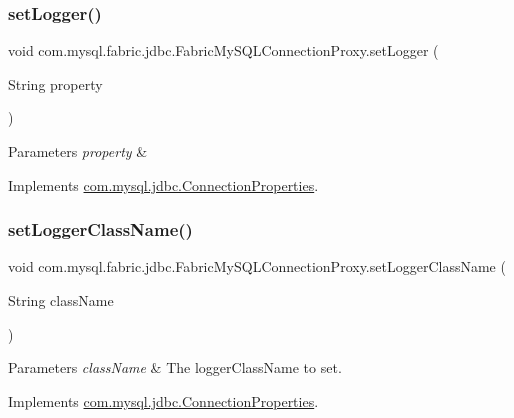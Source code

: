 \subsubsection{\texorpdfstring{set\+Logger()}{setLogger()}}
{\footnotesize\ttfamily void com.\+mysql.\+fabric.\+jdbc.\+Fabric\+My\+S\+Q\+L\+Connection\+Proxy.\+set\+Logger (\begin{DoxyParamCaption}\item[{String}]{property }\end{DoxyParamCaption})}


\begin{DoxyParams}{Parameters}
{\em property} & \\
\hline
\end{DoxyParams}


Implements \mbox{\hyperlink{interfacecom_1_1mysql_1_1jdbc_1_1_connection_properties_a9ad6baf8983bc1bf352b58b0e1634be1}{com.\+mysql.\+jdbc.\+Connection\+Properties}}.

\mbox{\label{classcom_1_1mysql_1_1fabric_1_1jdbc_1_1_fabric_my_s_q_l_connection_proxy_aefe48ee60272636a1e6ee1aaf99ddfc0}} 
\subsubsection{\texorpdfstring{set\+Logger\+Class\+Name()}{setLoggerClassName()}}
{\footnotesize\ttfamily void com.\+mysql.\+fabric.\+jdbc.\+Fabric\+My\+S\+Q\+L\+Connection\+Proxy.\+set\+Logger\+Class\+Name (\begin{DoxyParamCaption}\item[{String}]{class\+Name }\end{DoxyParamCaption})}


\begin{DoxyParams}{Parameters}
{\em class\+Name} & The logger\+Class\+Name to set. \\
\hline
\end{DoxyParams}


Implements \mbox{\hyperlink{interfacecom_1_1mysql_1_1jdbc_1_1_connection_properties_a4bde3c5c986dba54cf5ed53038cb7181}{com.\+mysql.\+jdbc.\+Connection\+Properties}}.

